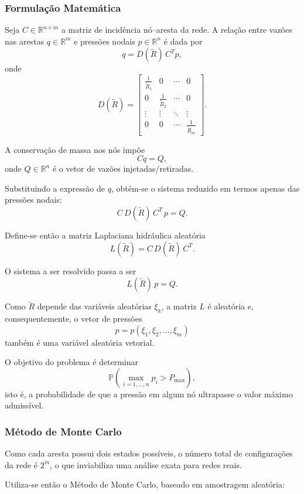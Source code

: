 \documentclass{article}
\begin{document}
\subsubsection{Formulação Matemática}

Seja \(C \in \mathbb{R}^{n \times m}\) a matriz de incidência nó–aresta da rede.
A relação entre vazões nas arestas \(q \in \mathbb{R}^m\) e pressões nodais
\(p \in \mathbb{R}^n\) é dada por
\[
q = D(\widetilde{R})\, C^T p,
\]
onde
\[
D(\widetilde{R}) =
\begin{bmatrix}
\frac{1}{\widetilde{R}_1} & 0 & \cdots & 0 \\
0 & \frac{1}{\widetilde{R}_2} & \cdots & 0 \\
\vdots & \vdots & \ddots & \vdots \\
0 & 0 & \cdots & \frac{1}{\widetilde{R}_m}
\end{bmatrix}.
\]

A conservação de massa nos nós impõe
\[
C q = Q,
\]
onde \(Q \in \mathbb{R}^n\) é o vetor de vazões injetadas/retiradas.

Substituindo a expressão de \(q\), obtém-se o sistema reduzido
em termos apenas das pressões nodais:
\[
C\, D(\widetilde{R})\, C^T\, p = Q.
\]

Define-se então a matriz Laplaciana hidráulica aleatória
\[
L(\widetilde{R}) = C\, D(\widetilde{R})\, C^T.
\]

O sistema a ser resolvido passa a ser
\[
L(\widetilde{R})\, p = Q.
\]

Como \(\widetilde{R}\) depende das variáveis aleatórias \(\xi_k\),
a matriz \(L\) é aleatória e, consequentemente,
o vetor de pressões
\[
p = p(\xi_1,\xi_2,\dots,\xi_m)
\]
também é uma variável aleatória vetorial.

O objetivo do problema é determinar
\[
\mathbb{P}\!\left(\max_{i=1,\dots,n} p_i > P_{\max}\right),
\]
isto é, a probabilidade de que a pressão em algum nó ultrapasse
o valor máximo admissível.

\subsubsection{Método de Monte Carlo}

Como cada aresta possui dois estados possíveis,
o número total de configurações da rede é \(2^m\),
o que inviabiliza uma análise exata para redes reais.

Utiliza-se então o Método de Monte Carlo, baseado em amostragem aleatória:
\end{document}
